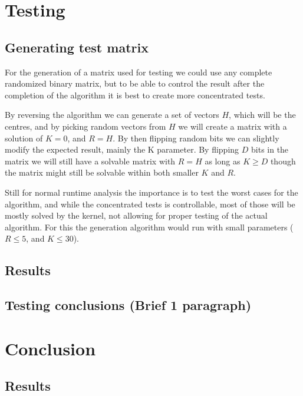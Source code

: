 \documentclass[a4paper]{article}
\begin{document}
%
%
\newpage

\section{Testing}
\subsection{Generating test matrix}
For the generation of a matrix used for testing we could use any complete randomized binary
matrix, but to be able to control the result after the completion of the algorithm it is best
to create more concentrated tests.



By reversing the algorithm we can generate a set of vectors $H$, which will be the centres,
and by picking random vectors from $H$ we will create a matrix with a solution of $K=0$,
and $R=H$. By then flipping random bits we can slightly modify the expected result, mainly
the K parameter. By flipping $D$ bits in the matrix we will still have a solvable matrix
with $R = H$ as long as $K \geq D$ though the matrix might still be solvable within both
smaller $K$ and $R$.


Still for normal runtime analysis the importance is to test the worst cases for the algorithm,
and while the concentrated tests is controllable, most of those will be mostly solved by the
kernel, not allowing for proper testing of the actual algorithm. For this the generation
algorithm would run with small parameters ($R \leq 5$, and $K \leq 30$).

\subsection{Results}
\subsection{Testing conclusions (Brief 1 paragraph)}

%
%
\newpage

\section{Conclusion}
\subsection{Results}
\end{document}
